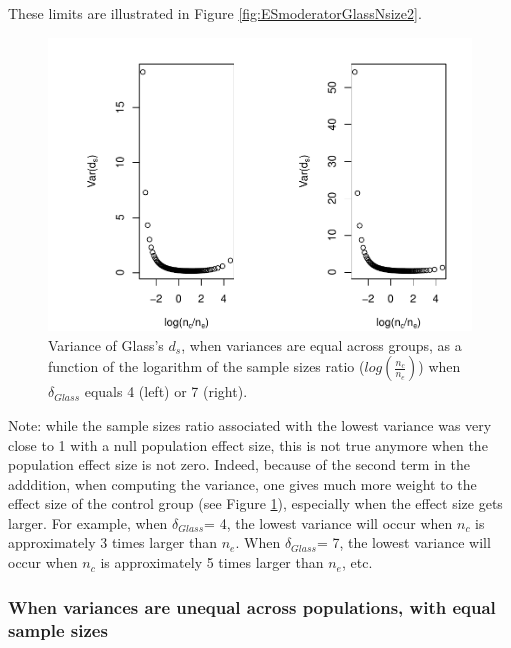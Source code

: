 \documentclass[
  english,
  man,mask]{apa6}
\begin{document}
These limits are illustrated in Figure \ref{fig:ESmoderatorGlassNsize2}.

\begin{figure}
\centering
\includegraphics{Theoretical-Variance-of-all-estimators-as-a-function-of-population-parameters_files/figure-latex/varglasshomNratiobis2-1.pdf}
\caption{\label{fig:varglasshomNratiobis2}Variance of Glass's \(d_s\), when variances are equal across groups, as a function of the logarithm of the sample sizes ratio (\(log\left(\frac{n_c}{n_e} \right)\)) when \(\delta_{Glass}\) equals 4 (left) or 7 (right).}
\end{figure}

Note: while the sample sizes ratio associated with the lowest variance was very close to 1 with a null population effect size, this is not true anymore when the population effect size is not zero. Indeed, because of the second term in the adddition, when computing the variance, one gives much more weight to the effect size of the control group (see Figure \ref{fig:varglasshomNratiobis2}), especially when the effect size gets larger. For example, when \(\delta_{Glass}\)= 4, the lowest variance will occur when \(n_c\) is approximately 3 times larger than \(n_e\). When \(\delta_{Glass}\)= 7, the lowest variance will occur when \(n_c\) is approximately 5 times larger than \(n_e\), etc.

\hypertarget{when-variances-are-unequal-across-populations-with-equal-sample-sizes}{%
\subsubsection{When variances are unequal across populations, with equal sample sizes}\label{when-variances-are-unequal-across-populations-with-equal-sample-sizes}}
\end{document}
